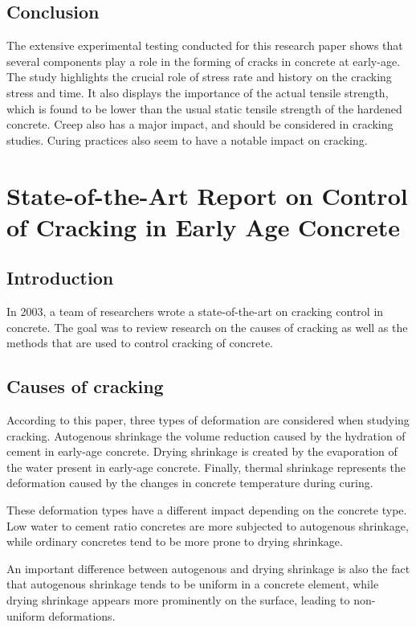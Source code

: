 \documentclass[a4paper,11pt]{memoir}
\begin{document}
\subsection{Conclusion}
The extensive experimental testing conducted for this research paper shows that
several components play a role in the forming of cracks in concrete at
early-age. The study highlights the crucial role of stress rate and history on
the cracking stress and time. It also displays the importance of the actual
tensile strength, which is found to be lower than the usual static tensile
strength of the hardened concrete. Creep also has a major impact, and should be
considered in cracking studies. Curing practices also seem to have a notable
impact on cracking.

\section[State-of-the-Art Report on Control of Cracking in Early Age Concrete]
{State-of-the-Art Report on Control of Cracking in Early Age Concrete \cite{soa}}

\subsection{Introduction}
In 2003, a team of researchers wrote a state-of-the-art on cracking control in
concrete. The goal was to review research on the causes of cracking as well as
the methods that are used to control cracking of concrete.

\subsection{Causes of cracking}
According to this paper, three types of deformation are considered when
studying cracking. Autogenous shrinkage the volume reduction
caused by the hydration of cement in early-age concrete. Drying shrinkage is
created by the evaporation of the water present in early-age concrete. Finally,
thermal shrinkage represents the deformation caused by the changes in concrete
temperature during curing.

These deformation types have a different impact depending on the concrete type.
Low water to cement ratio concretes are more subjected to autogenous shrinkage, while
ordinary concretes tend to be more prone to drying shrinkage.

An important difference between autogenous and drying shrinkage is also the
fact that autogenous shrinkage tends to be uniform in a concrete element, while
drying shrinkage appears more prominently on the surface, leading to non-uniform
deformations.
\end{document}
